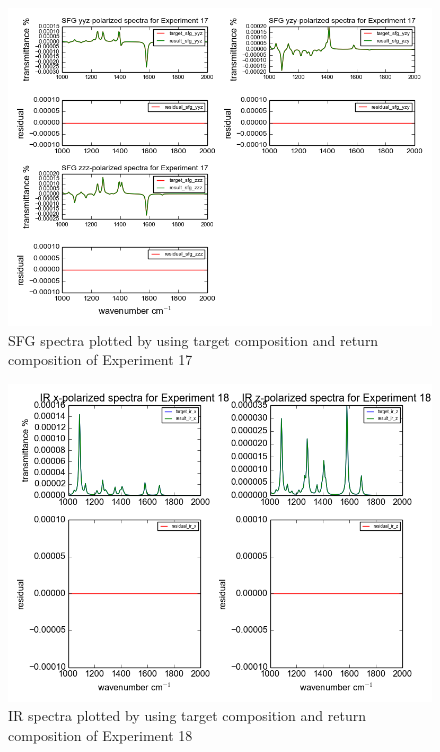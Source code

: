 \begin{figure}[!ht] \label{fig:4.4}
\centering
\includegraphics[scale=0.7]{Figures/chapter4_result_target_plotting_5datapoint_sfg.png}
\caption{SFG spectra plotted by using target composition and return composition of Experiment 17} 
\end{figure}

\begin{figure}[!ht] \label{fig:4.5}
\centering
\includegraphics[scale=0.7]{Figures/chapter4_result_target_plotting_500datapoint_ir.png}
\caption{IR spectra plotted by using target composition and return composition of Experiment 18} 
\end{figure}

